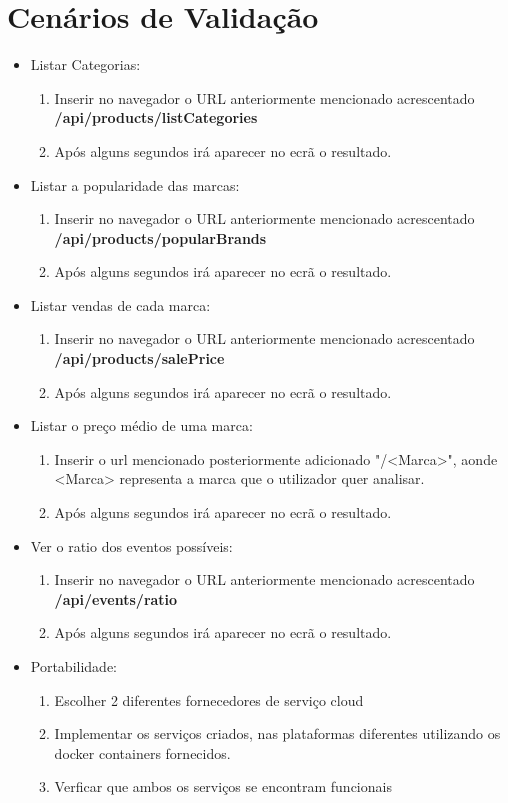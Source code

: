 \documentclass[11pt,a4paper]{article}
\begin{document}
\section{Cenários de Validação}	
\begin{itemize}
	\item Listar Categorias:
	\begin{enumerate}
		\item Inserir no navegador o URL anteriormente mencionado acrescentado \textbf{/api/products/listCategories}
		\item Após alguns segundos irá aparecer no ecrã o resultado.
	\end{enumerate}
	\item Listar a popularidade das marcas:
	\begin{enumerate}
		\item Inserir no navegador o URL anteriormente mencionado acrescentado \textbf{/api/products/popularBrands}
		\item Após alguns segundos irá aparecer no ecrã o resultado.
	\end{enumerate}
	\item Listar vendas de cada marca:
	\begin{enumerate}
		\item Inserir no navegador o URL anteriormente mencionado acrescentado \textbf{/api/products/salePrice}
		\item Após alguns segundos irá aparecer no ecrã o resultado.
	\end{enumerate}
	\item Listar o preço médio de uma marca:
	\begin{enumerate}
		\item Inserir o url mencionado posteriormente adicionado "/<Marca>", aonde <Marca> representa a marca que o utilizador quer analisar.
		\item Após alguns segundos irá aparecer no ecrã o resultado.
	\end{enumerate}
	\item Ver o ratio dos eventos possíveis:
	\begin{enumerate}
		\item Inserir no navegador o URL anteriormente mencionado acrescentado \textbf{/api/events/ratio}
		\item Após alguns segundos irá aparecer no ecrã o resultado.
	\end{enumerate}
	\item Portabilidade:
	\begin{enumerate}
		\item Escolher 2 diferentes fornecedores de serviço cloud
		\item Implementar os serviços criados, nas plataformas diferentes utilizando os docker containers fornecidos.
		\item Verficar que ambos os serviços se encontram funcionais
	\end{enumerate}


\end{itemize}
\end{document}
